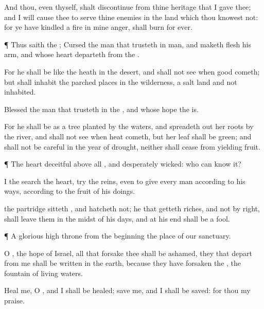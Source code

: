 {And thou, even thyself, shalt
discontinue from thine
heritage that I
gave thee; and I will cause thee to
serve thine
enemies in the
land which thou
knowest not: for ye have
kindled a
fire in mine
anger,
{} shall
burn
for
ever.


\par }{\PP {}¶ Thus
saith the
{};
Cursed
{} the
man that
trusteth in
man, and
maketh
flesh his
arm, and whose
heart
departeth from the
{}.

For he shall be like the
heath in the
desert, and shall not
see when
good
cometh; but shall
inhabit the parched
places in the
wilderness,
{} a
salt
land and not
inhabited.

Blessed
{} the
man that
trusteth in the
{}, and whose
hope the
{} is.

For he shall be as a
tree
planted by the
waters, and
{} spreadeth
out her
roots by the
river, and shall not
see when
heat
cometh, but her
leaf shall be
green; and shall not be
careful in the
year of
drought, neither shall
cease from
yielding
fruit.


\par }{\PP {}¶ The
heart
{}
deceitful above all
{}, and desperately
wicked: who can
know it?

I the
{}
search the
heart,
{}
try the
reins, even to
give every
man according to his
ways,
{} according to the
fruit of his
doings.

 the
partridge
sitteth
{}, and
hatcheth
{} not;
{} he that
getteth
riches, and not by
right, shall
leave them in the
midst of his
days, and at his
end shall be a
fool.


\par }{\PP {}¶ A
glorious
high
throne from the
beginning
{} the
place of our
sanctuary.

O
{}, the
hope of
Israel, all that
forsake thee shall be
ashamed,
{} they that
depart from
me shall be
written in the
earth, because they have
forsaken the
{}, the
fountain of
living
waters.

Heal me, O
{}, and I shall be
healed;
save me, and I shall be
saved: for thou
{} my
praise.


}
